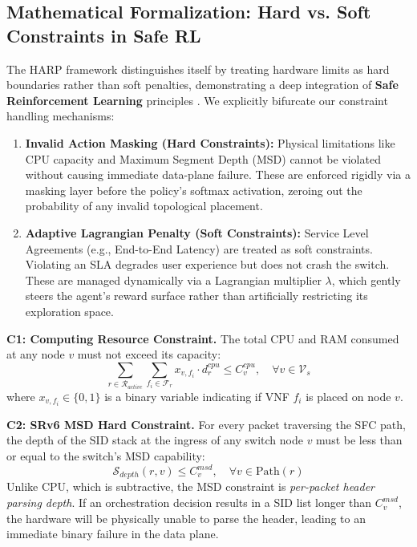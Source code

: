\documentclass[12pt, a4paper, reqno, oneside]{book}
\begin{document}
\subsection{Mathematical Formalization: Hard vs. Soft Constraints in Safe RL}
The HARP framework distinguishes itself by treating hardware limits as hard boundaries rather than soft penalties, demonstrating a deep integration of \textbf{Safe Reinforcement Learning} principles \cite{ray2019benchmarking, ma2022conservative}. We explicitly bifurcate our constraint handling mechanisms:
\begin{enumerate}
    \item \textbf{Invalid Action Masking (Hard Constraints):} Physical limitations like CPU capacity and Maximum Segment Depth (MSD) cannot be violated without causing immediate data-plane failure. These are enforced rigidly via a masking layer before the policy's softmax activation, zeroing out the probability of any invalid topological placement.
    \item \textbf{Adaptive Lagrangian Penalty (Soft Constraints):} Service Level Agreements (e.g., End-to-End Latency) are treated as soft constraints. Violating an SLA degrades user experience but does not crash the switch. These are managed dynamically via a Lagrangian multiplier $\lambda$, which gently steers the agent's reward surface rather than artificially restricting its exploration space.
\end{enumerate} 

\textbf{C1: Computing Resource Constraint.} The total CPU and RAM consumed at any node $v$ must not exceed its capacity:
\begin{equation}
\sum_{r \in \mathcal{R}_{active}} \sum_{f_i \in \mathcal{F}_r} x_{v, f_i} \cdot d_r^{cpu} \le C_v^{cpu}, \quad \forall v \in \mathcal{V}_s
\end{equation}
where $x_{v, f_i} \in \{0,1\}$ is a binary variable indicating if VNF $f_i$ is placed on node $v$.

\textbf{C2: SRv6 MSD Hard Constraint.} For every packet traversing the SFC path, the depth of the SID stack at the ingress of any switch node $v$ must be less than or equal to the switch's MSD capability:
\begin{equation}
\mathcal{S}_{depth}(r, v) \le C_v^{msd}, \quad \forall v \in \text{Path}(r)
\end{equation}
Unlike CPU, which is subtractive, the MSD constraint is \textit{per-packet header parsing depth}. If an orchestration decision results in a SID list longer than $C_v^{msd}$, the hardware will be physically unable to parse the header, leading to an immediate binary failure in the data plane.
\end{document}
